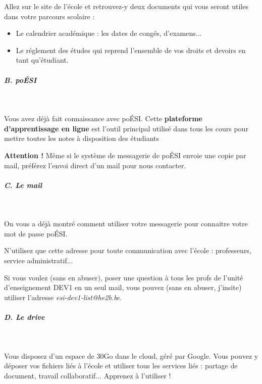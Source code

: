 \documentclass[a4paper,11pt]{article}
\begin{document}
 \par
        
\begin{Exercice}{}
Allez sur le site de l'\'ecole et retrouvez-y deux documents qui vous seront utiles dans votre parcours scolaire :
\begin{itemize}
\item Le calendrier acad\'emique : les dates de cong\'es, d'examens...
\item Le r\'eglement des \'etudes qui reprend l'ensemble de vos droits et devoirs en tant qu'\'etudiant.
\end{itemize}
\end{Exercice}				

        
\subparagraph{B. po\'ESI} 
\textcolor{white}{.} \par
Vous avez d\'ej\`a fait connaissance avec po\'ESI. Cette \textbf{plateforme d'apprentissage en ligne} est l'outil principal utilis\'e dans tous les cours pour mettre toutes les notes \`a disposition des \'etudiants
			
 \par
 \textbf{Attention !} M\^eme si le syst\`eme de messagerie de po\'ESI envoie une copie par mail, pr\'ef\'erez l'envoi direct d'un mail pour nous contacter. 
			
 \par
        
			
\subparagraph{C. Le mail} 
		
\textcolor{white}{.} \par On vous a d\'ej\`a montr\'e comment utiliser votre messagerie pour connaitre votre mot de passe 
po\'ESI. 
			
 \par N'utilisez que cette adresse pour toute communication avec l'\'ecole : professeurs, service administratif...
 \par
Si vous voulez (sans en abuser), poser une question \`a tous les profs de l'unit\'e d'enseignement DEV1 en un seul mail, vous pouvez (sans en abuser, j'insite) utiliser l'adresse \textit{esi-dev1-list@he2b.be}.
			
 \par
        
\subparagraph{D. Le drive} 
		
\textcolor{white}{.} \par
				
Vous disposez d'un espace de 30Go dans le cloud, g\'er\'e par Google. Vous pouvez y d\'eposer vos fichiers li\'es \`a l'\'ecole et utiliser tous les services li\'es : partage de document, travail collaboratif... Apprenez \`a l'utiliser !
			
\end{document}
